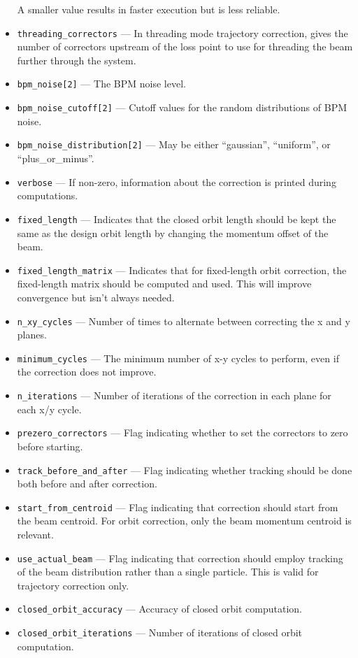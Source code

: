 \documentclass[11pt]{article}
\begin{document}
\begin{itemize}
  A smaller value results in faster execution but is less reliable.
\item \verb|threading_correctors| --- In threading mode trajectory correction, gives the number of correctors upstream of the loss point to
  use for threading the beam further through the system.
\item \verb|bpm_noise[2]| --- The BPM noise level. 
\item \verb|bpm_noise_cutoff[2]| --- Cutoff values for the random distributions of BPM noise.
\item \verb|bpm_noise_distribution[2]| --- May be either ``gaussian'', ``uniform'', or ``plus\_or\_minus''.
\item \verb|verbose| --- If non-zero, information about the correction is printed during computations.
\item \verb|fixed_length| --- Indicates that the closed orbit length should be kept the same as the design orbit
length by changing the momentum offset of the beam.
\item \verb|fixed_length_matrix| --- Indicates that for fixed-length orbit correction, the fixed-length
matrix should be computed and used.  This will improve convergence but isn't always needed.
\item \verb|n_xy_cycles| --- Number of times to alternate between correcting the x and y planes.
\item \verb|minimum_cycles| --- The minimum number of x-y cycles to perform, even if the correction does not improve.
\item \verb|n_iterations| --- Number of iterations of the correction in each plane for each x/y cycle.
\item \verb|prezero_correctors| --- Flag indicating whether to set the correctors to zero before starting.
\item \verb|track_before_and_after| --- Flag indicating whether tracking should be done both before and after
correction.
\item \verb|start_from_centroid| --- Flag indicating that correction
should start from the beam centroid.  For orbit correction, only the
beam momentum centroid is relevant.
\item \verb|use_actual_beam| --- Flag indicating that correction
should employ tracking of the beam distribution rather than a single
particle.  This is valid for trajectory correction only.
\item \verb|closed_orbit_accuracy| --- Accuracy of closed orbit computation.
\item \verb|closed_orbit_iterations| --- Number of iterations of closed orbit computation.

\end{itemize}
\end{document}
